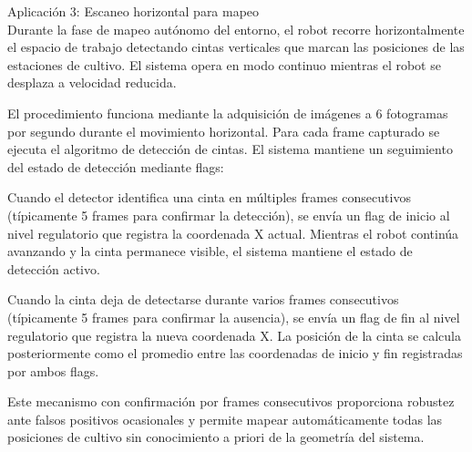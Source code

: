 Aplicación 3: Escaneo horizontal para mapeo\\
\noindent
Durante la fase de mapeo autónomo del entorno, el robot recorre horizontalmente el espacio de trabajo detectando cintas verticales que marcan las posiciones de las estaciones de cultivo. El sistema opera en modo continuo mientras el robot se desplaza a velocidad reducida.

El procedimiento funciona mediante la adquisición de imágenes a 6 fotogramas por segundo durante el movimiento horizontal. Para cada frame capturado se ejecuta el algoritmo de detección de cintas. El sistema mantiene un seguimiento del estado de detección mediante flags:

Cuando el detector identifica una cinta en múltiples frames consecutivos (típicamente 5 frames para confirmar la detección), se envía un flag de inicio al nivel regulatorio que registra la coordenada X actual. Mientras el robot continúa avanzando y la cinta permanece visible, el sistema mantiene el estado de detección activo.

Cuando la cinta deja de detectarse durante varios frames consecutivos (típicamente 5 frames para confirmar la ausencia), se envía un flag de fin al nivel regulatorio que registra la nueva coordenada X. La posición de la cinta se calcula posteriormente como el promedio entre las coordenadas de inicio y fin registradas por ambos flags.

Este mecanismo con confirmación por frames consecutivos proporciona robustez ante falsos positivos ocasionales y permite mapear automáticamente todas las posiciones de cultivo sin conocimiento a priori de la geometría del sistema.